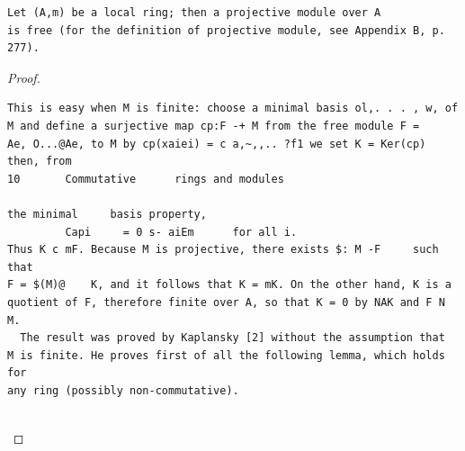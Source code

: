 \begin{theorem}\label{mcrt-auto-theorem-2-5}\uses{}
\begin{verbatim}
Let (A,m) be a local ring; then a projective module over A
is free (for the definition of projective module, see Appendix B, p. 277).
\end{verbatim}
\end{theorem}
\begin{proof}
\begin{verbatim}
This is easy when M is finite: choose a minimal basis ol,. . . , w, of
M and define a surjective map cp:F -+ M from the free module F =
Ae, O...@Ae, to M by cp(xaiei) = c a,~,,.. ?f1 we set K = Ker(cp) then, from
10       Commutative      rings and modules

the minimal     basis property,
         Capi     = 0 s- aiEm      for all i.
Thus K c mF. Because M is projective, there exists $: M -F     such that
F = $(M)@    K, and it follows that K = mK. On the other hand, K is a
quotient of F, therefore finite over A, so that K = 0 by NAK and F N M.
  The result was proved by Kaplansky [2] without the assumption that
M is finite. He proves first of all the following lemma, which holds for
any ring (possibly non-commutative).


\end{verbatim}
\end{proof}
